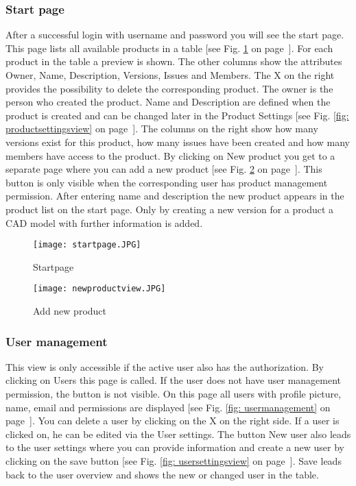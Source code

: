     \subsubsection*{Start page}
    After a successful login with username and password you will see the start page. This page lists all available products in a table [see Fig. \ref{fig: startpage} on page~\pageref{fig: startpage}]. For each product in the table a preview is shown. The other columns show the attributes Owner, Name, Description, Versions, Issues and Members. The X on the right provides the possibility to delete the corresponding product. The owner is the person who created the product. Name and Description are defined when the product is created and can be changed later in the Product Settings [see Fig. \ref{fig: productsettingsview} on page~\pageref{fig: productsettingsview}]. The columns on the right show how many versions exist for this product, how many issues have been created and how many members have access to the product. By clicking on New product you get to a separate page where you can add a new product [see Fig. \ref{fig: newproductview} on page~\pageref{fig: newproductview}]. This button is only visible when the corresponding user has product management permission. After entering name and description the new product appears in the product list on the start page. Only by creating a new version for a product a CAD model with further information is added.

    \begin{figure}[h]
        \centering
        \texttt{[image: startpage.JPG]}
        \caption{Startpage}
        \label{fig: startpage}
    \end{figure}

    \begin{figure}[h]
        \centering
        \texttt{[image: newproductview.JPG]}
        \caption{Add new product}
        \label{fig: newproductview}
    \end{figure}



    \subsubsection*{User management}
    This view is only accessible if the active user also has the authorization. By clicking on Users this page is called. If the user does not have user management permission, the button is not visible. On this page all users with profile picture, name, email and permissions are displayed [see Fig. \ref{fig: usermanagement} on page~\pageref{fig: usermanagement}]. You can delete a user by clicking on the X on the right side. If a user is clicked on, he can be edited via the User settings. The button New user also leads to the user settings where you can provide information and create a new user by clicking on the save button [see Fig. \ref{fig: usersettingsview} on page~\pageref{fig: usersettingsview}]. Save leads back to the user overview and shows the new or changed user in the table.
    
